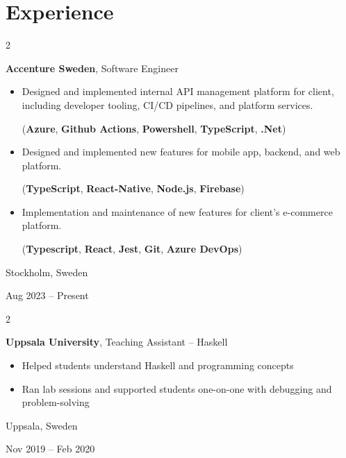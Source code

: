 \documentclass[10pt, letterpaper]{article}
\newenvironment{highlights}{
    \begin{itemize}[
        topsep=0.10 cm,
        parsep=0.10 cm,
        partopsep=0pt,
        itemsep=0pt,
        leftmargin=0.4 cm + 10pt
    ]
}{
    \end{itemize}
} %
\newenvironment{twocolentry}[2][]{
    \onecolentry
    \def\secondColumn{#2}
    \setcolumnwidth{\fill, 4.5 cm}
    \begin{paracol}{2}
}{
    \switchcolumn \raggedleft \secondColumn
    \end{paracol}
    \endonecolentry
} %
\begin{document}
\section{Experience}
        \begin{twocolentry}{
            Stockholm, Sweden

        Aug 2023 – Present
        }
            \textbf{Accenture Sweden}, Software Engineer
            \begin{highlights}
                \item Designed and implemented internal API management platform for client, including developer tooling, CI/CD pipelines, and platform services.
                
                (\textbf{Azure}, \textbf{Github Actions}, \textbf{Powershell}, \textbf{TypeScript}, \textbf{.Net})
                
                \item Designed and implemented new features for mobile app, backend, and web platform. 
                
                (\textbf{TypeScript}, \textbf{React-Native}, \textbf{Node.js}, \textbf{Firebase})
                
                \item Implementation and maintenance of new features for client’s e-commerce platform.
                
                (\textbf{Typescript}, \textbf{React}, \textbf{Jest}, \textbf{Git}, \textbf{Azure DevOps})
                
            \end{highlights}
        \end{twocolentry}


        \vspace{0.2 cm}

        \begin{twocolentry}{
            Uppsala, Sweden

        Nov 2019 – Feb 2020
        }
            \textbf{Uppsala University}, Teaching Assistant – Haskell
            \begin{highlights}
                \item Helped students understand Haskell and programming concepts
                \item Ran lab sessions and supported students one-on-one with debugging and problem-solving
            \end{highlights}
        \end{twocolentry}
        
\end{document}
